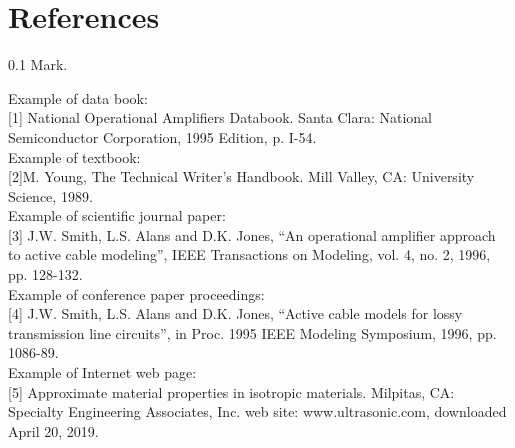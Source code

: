 \documentclass[journal]{IEEEtran}
\begin{document}

%
%
%


\printbibliography

\section*{References}
\begin{flushright} 0.1 Mark. \end{flushright}

Example of data book:\\[0.1in]
[1] National Operational Amplifiers Databook. Santa Clara: National Semiconductor
Corporation, 1995 Edition, p. I-54. \\[0.1in]
Example of textbook: \\[0.1in]
[2]M. Young, The Technical Writer’s Handbook. Mill Valley, CA: University Science, 1989.\\[0.1in]
Example of scientific journal paper:\\[0.1in]
[3] J.W. Smith, L.S. Alans and D.K. Jones, “An operational amplifier approach to
active cable modeling”, IEEE Transactions on Modeling, vol. 4, no. 2, 1996, pp.
128-132.\\[0.1in]
Example of conference paper proceedings:\\[0.1in]
[4] J.W. Smith, L.S. Alans and D.K. Jones, “Active cable models for lossy
transmission line circuits”, in Proc. 1995 IEEE Modeling Symposium, 1996, pp.
1086-89.\\[0.1in]

Example of Internet web page:\\[0.1in]
[5] Approximate material properties in isotropic materials. Milpitas, CA: Specialty Engineering Associates, Inc. web site: www.ultrasonic.com, downloaded April 20, 2019.  \\[0.1in]
\end{document}
